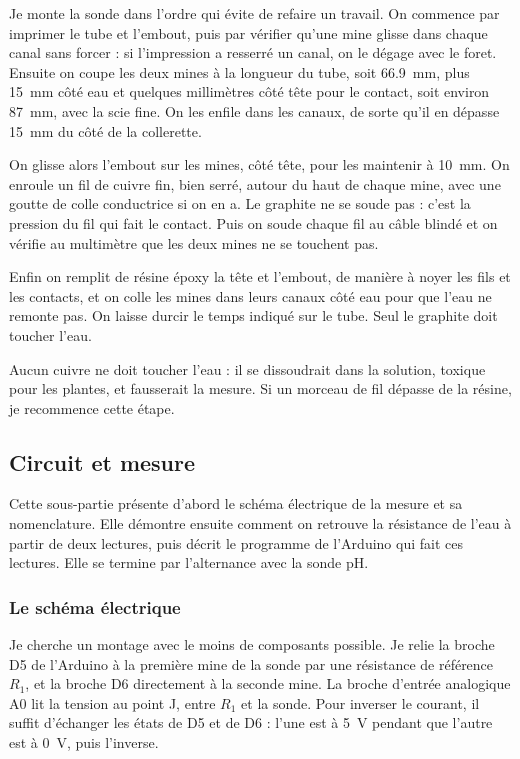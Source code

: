 Je monte la sonde dans l'ordre qui évite de refaire un travail. On commence par imprimer le tube et l'embout, puis par vérifier qu'une mine glisse dans chaque canal sans forcer : si l'impression a resserré un canal, on le dégage avec le foret. Ensuite on coupe les deux mines à la longueur du tube, soit \qty{66,9}{mm}, plus \qty{15}{mm} côté eau et quelques millimètres côté tête pour le contact, soit environ \qty{87}{mm}, avec la scie fine. On les enfile dans les canaux, de sorte qu'il en dépasse \qty{15}{mm} du côté de la collerette.

On glisse alors l'embout sur les mines, côté tête, pour les maintenir à \qty{10}{mm}. On enroule un fil de cuivre fin, bien serré, autour du haut de chaque mine, avec une goutte de colle conductrice si on en a. Le graphite ne se soude pas : c'est la pression du fil qui fait le contact. Puis on soude chaque fil au câble blindé et on vérifie au multimètre que les deux mines ne se touchent pas.

Enfin on remplit de résine époxy la tête et l'embout, de manière à noyer les fils et les contacts, et on colle les mines dans leurs canaux côté eau pour que l'eau ne remonte pas. On laisse durcir le temps indiqué sur le tube. Seul le graphite doit toucher l'eau.

\begin{attention}
Aucun cuivre ne doit toucher l'eau : il se dissoudrait dans la solution, toxique pour les plantes, et fausserait la mesure. Si un morceau de fil dépasse de la résine, je recommence cette étape.
\end{attention}

\subsection{Circuit et mesure}

Cette sous-partie présente d'abord le schéma électrique de la mesure et sa nomenclature. Elle démontre ensuite comment on retrouve la résistance de l'eau à partir de deux lectures, puis décrit le programme de l'Arduino qui fait ces lectures. Elle se termine par l'alternance avec la sonde pH.

\subsubsection*{Le schéma électrique}

Je cherche un montage avec le moins de composants possible. Je relie la broche D5 de l'Arduino à la première mine de la sonde par une résistance de référence $R_1$, et la broche D6 directement à la seconde mine. La broche d'entrée analogique A0 lit la tension au point J, entre $R_1$ et la sonde. Pour inverser le courant, il suffit d'échanger les états de D5 et de D6 : l'une est à \qty{5}{V} pendant que l'autre est à \qty{0}{V}, puis l'inverse.

